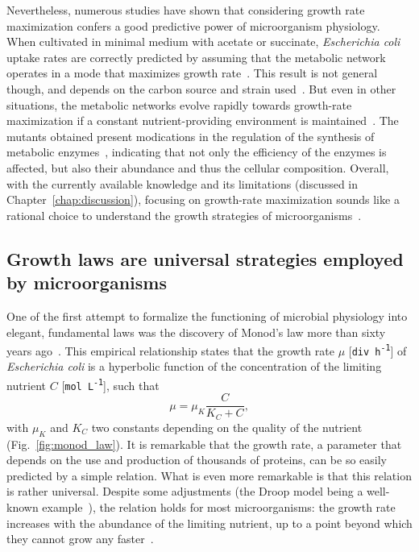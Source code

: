 Nevertheless, numerous studies have shown that considering growth rate maximization confers a good predictive power of microorganism physiology.
When cultivated in minimal medium with acetate or succinate, \textit{Escherichia coli} uptake rates are correctly predicted by assuming that the metabolic network operates in a mode that maximizes growth rate~\cite{edwards_silico_2001}.
This result is not general though, and depends on the carbon source and strain used~\cite{ibarra_escherichia_2002}.
But even in other situations, the metabolic networks evolve rapidly towards growth-rate maximization if a constant nutrient-providing environment is maintained~\cite{ibarra_escherichia_2002}.
The mutants obtained present modications in the regulation of the synthesis of metabolic enzymes~\cite{lewis_omic_2010}, indicating that not only the efficiency of the enzymes is affected, but also their abundance and thus the cellular composition.
Overall, with the currently available knowledge and its limitations (discussed in Chapter~\ref{chap:discussion}), focusing on growth-rate maximization sounds like a rational choice to understand the growth strategies of microorganisms~\cite{molenaar_shifts_2009}.

\subsection{Growth laws are universal strategies employed by microorganisms}

One of the first attempt to formalize the functioning of microbial physiology into elegant, fundamental laws was the discovery of Monod's law more than sixty years ago~\cite{monod_growth_1949}.
This empirical relationship states that the growth rate $\mu$ [\texttt{div~h\textsuperscript{-1}}] of \textit{Escherichia coli} is a hyperbolic function of the concentration of the limiting nutrient $C$ [\texttt{mol~L\textsuperscript{-1}}], such that
\begin{equation}
\label{eq:monod_law}
\mu = \mu_K \frac{C}{K_C + C},
\end{equation}
with $\mu_K$ and $K_C$ two constants depending on the quality of the nutrient (Fig.~\ref{fig:monod_law}).
It is remarkable that the growth rate, a parameter that depends on the use and production of thousands of proteins, can be so easily predicted by a simple relation.
What is even more remarkable is that this relation is rather universal.
Despite some adjustments (the Droop model being a well-known example~\cite{droop_thoughts_1973}), the relation holds for most microorganisms: the growth rate increases with the abundance of the limiting nutrient, up to a point beyond which they cannot grow any faster~\cite{koch_why_1988}.

